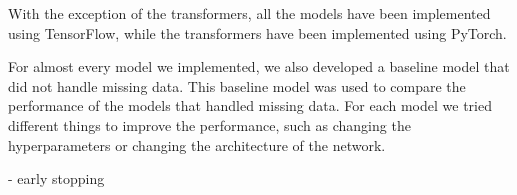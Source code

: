 With the exception of the transformers, all the models have been implemented using TensorFlow, while the transformers have been implemented using PyTorch.

For almost every model we implemented, we also developed a baseline model that did not handle missing data.
This baseline model was used to compare the performance of the models that handled missing data.
For each model we tried different things to improve the performance, such as changing the hyperparameters or changing the architecture of the network.
 

- early stopping\\



